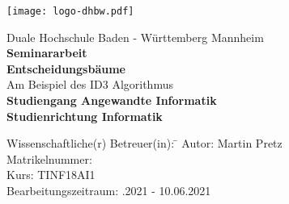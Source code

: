 \begin{titlepage}
    \begin{minipage}{\textwidth}
        \vspace{-2cm}
        \texttt{[image: logo-dhbw.pdf]}
    \end{minipage}
    \vspace{1em}

    \begin{center}
		{\textsf{\large Duale Hochschule Baden - W\"urttemberg Mannheim}}\\[4em]
		{\textsf{\textbf{\large{Seminararbeit}}}}\\[6mm]                                 %
		{\textsf{\textbf{\Large{Entscheidungsbäume}}}} \\[0.5cm]                        %
		{\textsf{Am Beispiel des ID3 Algorithmus}} \\[1.5cm]
		{\textsf{\textbf{\large{Studiengang Angewandte Informatik}}}}\\[6mm]
		{\textsf{\textbf{Studienrichtung Informatik}}}\vspace{12em}
		\begin{minipage}{\textwidth}
			\begin{tabbing}
				Wissenschaftliche(r) Betreuer(in): \hspace{0.85cm}\=\kill
				Autor: \> Martin Pretz \\[1.5mm]
				Matrikelnummer:  \\[1.5mm]
				Kurs: \> TINF18AI1 \\[1.5mm]
				Bearbeitungszeitraum: .2021 - 10.06.2021 \\[1.5mm]
			\end{tabbing}
		\end{minipage}
	\end{center}
\end{titlepage}